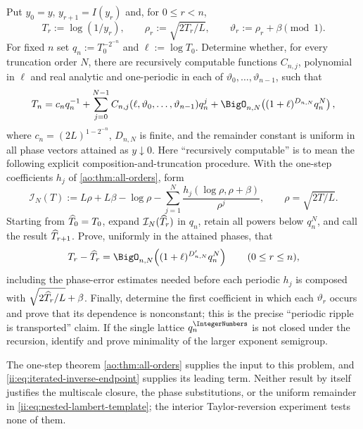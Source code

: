 \begin{problem}
\label{ii:prob:nested-lambert}
Put $y_0=y$, $y_{r+1}=I(y_r)$ and, for $0\le r<n$,
\[
 T_r:=\log(1/y_r),\qquad
 \rho_r:=\sqrt{2T_r/L},\qquad
 \vartheta_r:=\rho_r+\beta\pmod{1}.
\]
For fixed $n$ set $q_n:=T_0^{-2^{-n}}$ and $\ell:=\log T_0$.
Determine whether, for every truncation order $N$, there are recursively
computable functions $C_{n,j}$, polynomial in $\ell$ and real analytic and
one-periodic in each of $\vartheta_0,\ldots,\vartheta_{n-1}$, such that
\begin{equation}
 T_n=c_nq_n^{-1}
 +\sum_{j=0}^{N-1}
 C_{n,j}(\ell,\vartheta_0,\ldots,\vartheta_{n-1})q_n^j
 +\BigO_{n,N}\!\left((1+\ell)^{D_{n,N}}q_n^N\right),
 \label{ii:eq:nested-lambert-template}
\end{equation}
where $c_n=(2L)^{1-2^{-n}}$, $D_{n,N}$ is finite, and the remainder
constant is uniform in all phase vectors attained as $y\downarrow0$.
Here ``recursively computable'' is to mean the following explicit
composition-and-truncation procedure.  With the one-step coefficients $h_j$
of \cref{ao:thm:all-orders}, form
\[
 \mathcal I_N(T):=L\rho+L\beta-\log\rho
 -\sum_{j=1}^{N}\frac{h_j(\log\rho,\rho+\beta)}{\rho^j},
 \qquad \rho=\sqrt{2T/L}.
\]
Starting from $\widehat{T}_{0}=T_0$, expand
$\mathcal I_N(\widehat{T}_{r})$ in $q_n$, retain all powers below $q_n^N$,
and call the result $\widehat{T}_{r+1}$.  Prove, uniformly in the attained
phases, that
\[
 T_r-\NestedLambertLogApproximation{r}
 =\BigO_{n,N}\!\left((1+\ell)^{D'_{n,N}}q_n^N\right)
 \qquad(0\le r\le n),
\]
including the phase-error estimates needed before each periodic $h_j$ is
composed with $\sqrt{2\widehat{T}_{r}/L}+\beta$.  Finally, determine the first
coefficient in which each $\vartheta_r$ occurs and prove that its dependence
is nonconstant; this is the precise ``periodic ripple is transported''
claim.  If the single lattice $q_n^{\IntegerNumbers}$ is not closed under the
recursion, identify and prove minimality of the larger exponent semigroup.
\end{problem}

The one-step theorem \cref{ao:thm:all-orders} supplies the input to this
problem, and \eqref{ii:eq:iterated-inverse-endpoint} supplies its leading
term.  Neither result by itself justifies the multiscale closure, the phase
substitutions, or the uniform remainder in
\eqref{ii:eq:nested-lambert-template}; the interior Taylor-reversion
experiment tests none of them.

